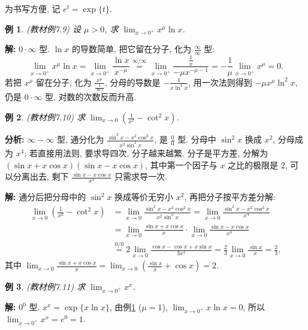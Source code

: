 \documentclass[UTF8,openany]{ctexbook}
\theoremstyle{chinesetextbook}
\newtheorem{example}{例}[section]
\newenvironment{cnsolution}{\par\indent\textbf{解:} \ignorespaces}{\par}
\begin{document}
为书写方便, 记 $e^t=\exp\{t\}$.
\begin{example}\label{ex:c2-7-9}
\textnormal{(教材例7.9)} 设 $\mu>0$, 求 $\displaystyle\lim_{x\to0^+}x^\mu\ln x$.
\end{example}
\begin{cnsolution}
$0\cdot\infty$ 型. $\ln x$ 的导数简单, 把它留在分子, 化为 $\displaystyle\frac\infty\infty$ 型:
\[
\lim_{x\to0^+}x^\mu\ln x=\lim_{x\to0^+}\frac{\ln x}{x^{-\mu}}\overset{\infty/\infty}{=}\lim_{x\to0^+}\frac{\frac1x}{-\mu x^{-\mu-1}}=-\frac1\mu\lim_{x\to0^+}x^\mu=0.
\]
若把 $x^\mu$ 留在分子, 化为 $\displaystyle\frac{x^\mu}{\frac1{\ln x}}$, 分母的导数是 $\displaystyle-\frac1{x\ln^2x}$, 用一次法则得到 $-\mu x^\mu\ln^2x$, 仍是 $0\cdot\infty$ 型, 对数的次数反而升高.
\end{cnsolution}
\begin{example}\label{ex:c2-7-10}
\textnormal{(教材例7.10)} 求 $\displaystyle\lim_{x\to0}\left(\frac1{x^2}-\cot^2x\right)$.
\end{example}
\par\indent\textbf{分析:} $\infty-\infty$ 型, 通分化为 $\displaystyle\frac{\sin^2x-x^2\cos^2x}{x^2\sin^2x}$, 是 $\displaystyle\frac00$ 型. 分母中 $\sin^2x$ 换成 $x^2$, 分母成为 $x^4$; 若直接用法则, 要求导四次, 分子越来越繁. 分子是平方差, 分解为 $(\sin x+x\cos x)(\sin x-x\cos x)$, 其中第一个因子与 $x$ 之比的极限是 $2$, 可以分离出去, 剩下 $\displaystyle\frac{\sin x-x\cos x}{x^3}$ 只需求导一次.
\begin{cnsolution}
通分后把分母中的 $\sin^2x$ 换成等价无穷小 $x^2$, 再把分子按平方差分解:
\[
\begin{aligned}
\lim_{x\to0}\left(\frac1{x^2}-\cot^2x\right)&=\lim_{x\to0}\frac{\sin^2x-x^2\cos^2x}{x^2\sin^2x}=\lim_{x\to0}\frac{\sin^2x-x^2\cos^2x}{x^4}\\
&=\lim_{x\to0}\frac{\sin x+x\cos x}x\cdot\lim_{x\to0}\frac{\sin x-x\cos x}{x^3}\\
&\overset{0/0}{=}2\lim_{x\to0}\frac{\cos x-\cos x+x\sin x}{3x^2}=\frac23\lim_{x\to0}\frac{\sin x}x=\frac23,
\end{aligned}
\]
其中 $\displaystyle\lim_{x\to0}\frac{\sin x+x\cos x}x=\lim_{x\to0}\left(\frac{\sin x}x+\cos x\right)=2$.
\end{cnsolution}
\begin{example}\label{ex:c2-7-11}
\textnormal{(教材例7.11)} 求 $\displaystyle\lim_{x\to0^+}x^x$.
\end{example}
\begin{cnsolution}
$0^0$ 型. $x^x=\exp\{x\ln x\}$, 由例\ref{ex:c2-7-9} ($\mu=1$), $\displaystyle\lim_{x\to0^+}x\ln x=0$, 所以 $\displaystyle\lim_{x\to0^+}x^x=e^0=1$.
\end{cnsolution}
\end{document}
